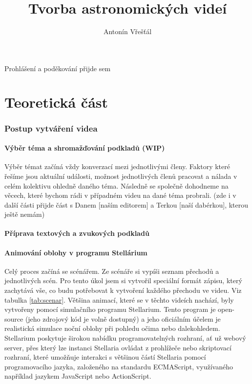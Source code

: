 \documentclass[12pt,a4paper,titlepage]{article}
\author{Antonín Vřešťál}
\title{Tvorba astronomických videí}
\begin{document}
\maketitle

\tableofcontents
\newpage
Prohlášení a poděkování přijde sem
\newpage
\part{Teoretická část}
\section{Postup vytváření videa}
\subsection{Výběr téma a shromažďování podkladů (WIP)}
Výběr témat začíná vždy konverzací mezi jednotlivými členy. Faktory které řešíme jsou aktuální události, možnost jednotlivých členů pracovat a nálada v celém kolektivu ohledně daného téma. Následně se společně dohodneme na věcech, které bychom rádi v případném videu na dané téma probrali. (zde i v další části přijde část s Danem [naším editorem] a Terkou [naší dabérkou], kterou ještě nemám)
\subsection{Příprava textových a zvukových podkladů}
\subsection{Animování oblohy v programu Stellárium} \label{makingof:stellarium}
Celý proces začíná se scénářem. Ze scénáře si vypíši seznam přechodů a jednotlivých scén. Pro tento úkol jsem si vytvořil speciální formát zápisu, který zachytává vše, co budu potřebovat k vytvoření každého přechodu ve videu. Viz tabulka \ref{tab:scenar}.
Většina animací, které se v těchto videích nachází, byly vytvořeny pomocí simulačního programu Stellarium. Tento program je open-source (jeho zdrojový kód je volně dostupný) a jeho oficiálním účelem je realistická simulace noční oblohy při pohledu očima nebo dalekohledem. Stellarium poskytuje širokou nabídku programovatelných rozhraní, ať už webový server, přes který lze instanci Stellaria ovládat z prohlížeče nebo skriptovací rozhraní, které umožňuje interakci s většinou částí Stellaria pomocí programovacího jazyka, založeného na standardu ECMAScript, využívaného například jazykem JavaScript nebo ActionScript.
\end{document}
